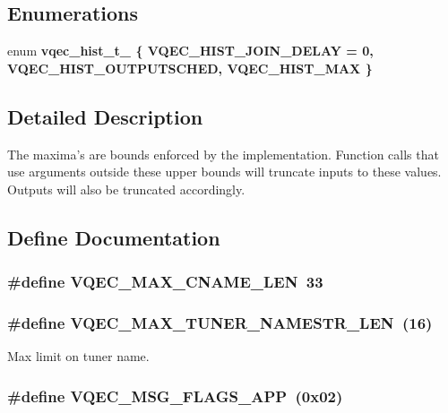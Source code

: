 \subsection*{Enumerations}
\begin{CompactItemize}
\item 
enum \bf{vqec\_\-hist\_\-t\_\-} \{ \bf{VQEC\_\-HIST\_\-JOIN\_\-DELAY} =  0, 
\bf{VQEC\_\-HIST\_\-OUTPUTSCHED}, 
\bf{VQEC\_\-HIST\_\-MAX}
 \}
\end{CompactItemize}


\subsection{Detailed Description}
The maxima's are bounds enforced by the implementation. Function calls that use arguments outside these upper bounds will truncate inputs to these values. Outputs will also be truncated accordingly. 

\subsection{Define Documentation}
\subsubsection{\setlength{\rightskip}{0pt plus 5cm}\#define VQEC\_\-MAX\_\-CNAME\_\-LEN~33}\label{group__gdefs_gded9b9f26b23c5972c12ece28602a69b}


\subsubsection{\setlength{\rightskip}{0pt plus 5cm}\#define VQEC\_\-MAX\_\-TUNER\_\-NAMESTR\_\-LEN~(16)}\label{group__gdefs_ge841bec9a79e5d763d57494a1728c5d1}


Max limit on tuner name. 

\subsubsection{\setlength{\rightskip}{0pt plus 5cm}\#define VQEC\_\-MSG\_\-FLAGS\_\-APP~(0x02)}\label{group__gdefs_g80860cdbde027a20d0152adbc330e853}


